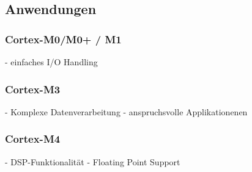\subsection{Anwendungen}
\begin{multicols}{3}
    \begin{minipage}{\linewidth}
       \subsubsection{Cortex-M0/M0+ / M1}  
        - einfaches I/O Handling 
    \end{minipage}
    
    \begin{minipage}{\linewidth}
        \subsubsection{Cortex-M3}   
        - Komplexe Datenverarbeitung\newline
        - anspruchsvolle Applikationenen
    \end{minipage}

    \begin{minipage}{\linewidth}
        \subsubsection{Cortex-M4}   
       -  DSP-Funktionalität\newline
       -  Floating Point Support
    \end{minipage}
\end{multicols}
    
